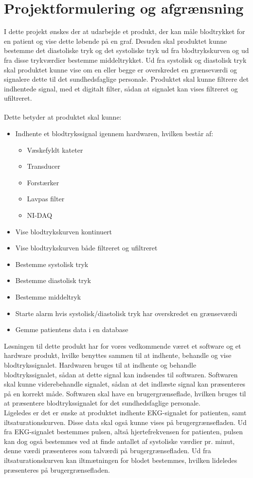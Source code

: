 \chapter{Projektformulering og afgrænsning}
I dette projekt ønskes der at udarbejde et produkt, der kan måle blodtrykket for en patient og vise dette løbende på en graf. Desuden skal produktet kunne bestemme det diastoliske tryk og det systoliske tryk ud fra blodtrykskurven og ud fra disse trykværdier bestemme middeltrykket. Ud fra systolisk og diastolisk tryk skal produktet kunne vise om en eller begge er overskredet en grænseværdi og signalere dette til det sundhedsfaglige personale. Produktet skal kunne filtrere det indhentede signal, med et digitalt filter, sådan at signalet kan vises filtreret og ufiltreret.  \\\\
Dette betyder at produktet skal kunne:
\begin{itemize}
\item Indhente et blodtrykssignal igennem hardwaren, hvilken består af:
\begin{itemize}
\item Væskefyldt kateter
\item Transducer 
\item Forstærker
\item Lavpas filter
\item NI-DAQ
\end{itemize}
\item Vise blodtrykskurven kontinuert
\item Vise blodtrykskurven både filtreret og ufiltreret
\item Bestemme systolisk tryk
\item Bestemme diastolisk tryk
\item Bestemme middeltryk
\item Starte alarm hvis systolisk/diastolisk tryk har overskredet en grænseværdi
\item Gemme patientens data i en database
\end{itemize}
Løsningen til dette produkt har for vores vedkommende været et software og et hardware produkt, hvilke benyttes sammen til at indhente, behandle og vise blodtrykssignalet. Hardwaren bruges til at indhente og behandle blodtrykssignalet, sådan at dette signal kan indsendes til softwaren. Softwaren skal kunne viderebehandle signalet, sådan at det indlæste signal kan præsenteres på en korrekt måde. Softwaren skal have en brugergrænseflade, hvilken bruges til at præsentere blodtrykssignalet for det sundhedsfaglige personale. \\
Ligeledes er det er ønske at produktet indhente EKG-signalet for patienten, samt iltsaturationskurven. Disse data skal også kunne vises på brugergrænsefladen. Ud fra EKG-signalet bestemmes pulsen, altså hjertefrekvensen for patienten, pulsen kan dog også bestemmes ved at finde antallet af systoliske værdier pr. minut, denne værdi præsenteres som talværdi på brugergrænsefladen. Ud fra iltsaturationskurven kan iltmætningen for blodet bestemmes, hvilken lideledes præsenteres på brugergrænsefladen. 
